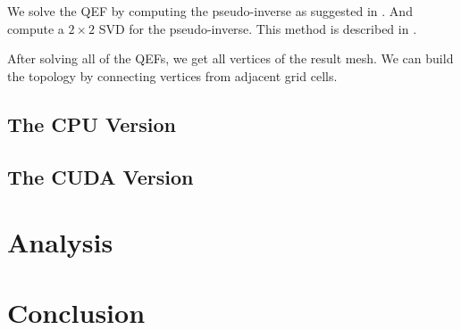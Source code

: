 \documentclass[a4paper,12pt]{article}
\begin{document}
We solve the QEF by computing the pseudo-inverse
as suggested in \cite{ju2002dual}.
And compute a $2\times2$ SVD for the pseudo-inverse.
This method is described in \cite{blinn2003jim}.

After solving all of the QEFs, we get all vertices of the result mesh.
We can build the topology by connecting vertices from
adjacent grid cells.

\subsection{The CPU Version}

\subsection{The CUDA Version}

\section{Analysis}

\section{Conclusion}

\newpage
{}


\end{document}
